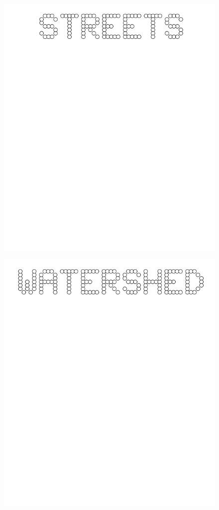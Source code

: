 \documentclass[17pt]{extreport}
\begin{document}
	 \begin{figure}
		\centering
		\includegraphics[width=6.25in]{imageserver/uploadimages/streets.png}
	\end{figure}	
	 \begin{figure}
		\centering
		\includegraphics[width=6.25in]{imageserver/uploadimages/watershed.png}
	\end{figure}	
\end{document}
